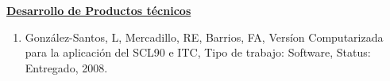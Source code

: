{\large \textbf{\underline{Desarrollo de Productos técnicos}}}

\begin{enumerate}
\item González-Santos, L, Mercadillo, RE, Barrios, FA, Versíon Computarizada para la aplicación del 
SCL90 e ITC, Tipo de trabajo: Software, Status: Entregado, 2008.
\end{enumerate}

